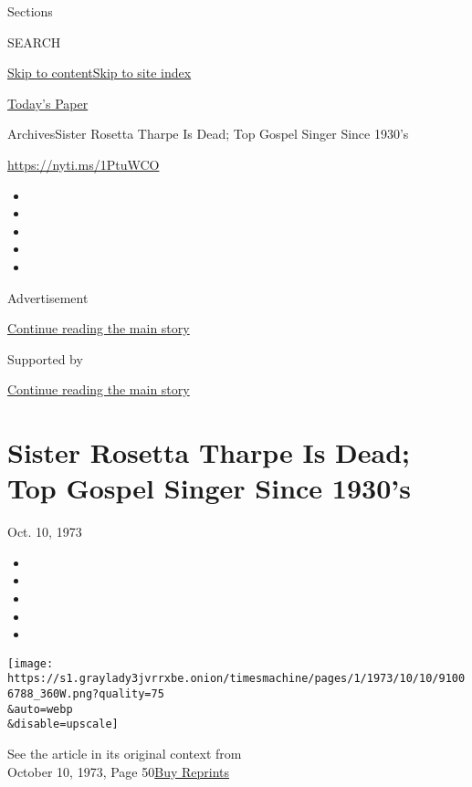 Sections

SEARCH

\protect\hyperlink{site-content}{Skip to
content}\protect\hyperlink{site-index}{Skip to site index}

\href{https://myaccount.nytimes3xbfgragh.onion/auth/login?response_type=cookie\&client_id=vi}{}

\href{https://www.nytimes3xbfgragh.onion/section/todayspaper}{Today's
Paper}

Archives\textbar{}Sister Rosetta Tharpe Is Dead; Top Gospel Singer Since
1930's

\url{https://nyti.ms/1PtuWCO}

\begin{itemize}
\item
\item
\item
\item
\item
\end{itemize}

Advertisement

\protect\hyperlink{after-top}{Continue reading the main story}

Supported by

\protect\hyperlink{after-sponsor}{Continue reading the main story}

\hypertarget{sister-rosetta-tharpe-is-dead-top-gospel-singer-since-1930s}{%
\section{Sister Rosetta Tharpe Is Dead; Top Gospel Singer Since
1930's}\label{sister-rosetta-tharpe-is-dead-top-gospel-singer-since-1930s}}

Oct. 10, 1973

\begin{itemize}
\item
\item
\item
\item
\item
\end{itemize}

\texttt{[image: https://s1.graylady3jvrrxbe.onion/timesmachine/pages/1/1973/10/10/91006788\_360W.png?quality=75\\\&auto=webp\\\&disable=upscale]}

See the article in its original context from\\
October 10, 1973, Page
50\href{https://store.nytimes3xbfgragh.onion/collections/new-york-times-page-reprints?utm_source=nytimes\&utm_medium=article-page\&utm_campaign=reprints}{Buy
Reprints}

